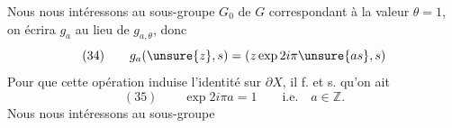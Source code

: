 
Nous nous intéressons au sous-groupe $G_0$ de $G$ correspondant à la valeur $\theta=1$, on écrira $g_a$ au lieu de $g_{a,\theta}$, donc
\[
(34)\qquad g_a(\unsure{z},s)=(z\exp2i\pi\unsure{as},s)
\]
Pour que cette opération induise l'identité sur $\partial X$, il f. et s. qu'on ait
\[
(35)\qquad\exp2i\pi a=1\qquad\text{i.e.}\quad a\in\mathbb Z.
\]
Nous nous intéressons au sous-groupe
